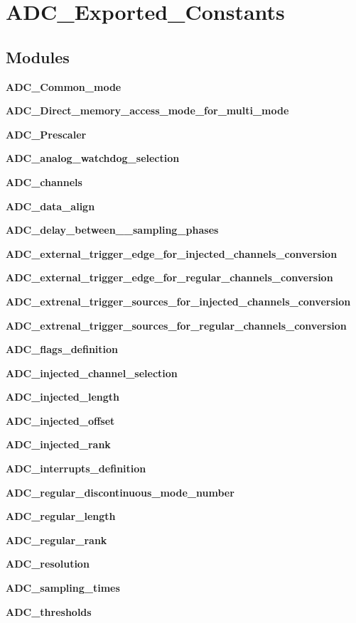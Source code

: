 \section{A\+D\+C\+\_\+\+Exported\+\_\+\+Constants}
\label{group__ADC__Exported__Constants}
\subsection*{Modules}
\begin{DoxyCompactItemize}
\item 
\textbf{ A\+D\+C\+\_\+\+Common\+\_\+mode}
\item 
\textbf{ A\+D\+C\+\_\+\+Direct\+\_\+memory\+\_\+access\+\_\+mode\+\_\+for\+\_\+multi\+\_\+mode}
\item 
\textbf{ A\+D\+C\+\_\+\+Prescaler}
\item 
\textbf{ A\+D\+C\+\_\+analog\+\_\+watchdog\+\_\+selection}
\item 
\textbf{ A\+D\+C\+\_\+channels}
\item 
\textbf{ A\+D\+C\+\_\+data\+\_\+align}
\item 
\textbf{ A\+D\+C\+\_\+delay\+\_\+between\+\_\+\_\+sampling\+\_\+phases}
\item 
\textbf{ A\+D\+C\+\_\+external\+\_\+trigger\+\_\+edge\+\_\+for\+\_\+injected\+\_\+channels\+\_\+conversion}
\item 
\textbf{ A\+D\+C\+\_\+external\+\_\+trigger\+\_\+edge\+\_\+for\+\_\+regular\+\_\+channels\+\_\+conversion}
\item 
\textbf{ A\+D\+C\+\_\+extrenal\+\_\+trigger\+\_\+sources\+\_\+for\+\_\+injected\+\_\+channels\+\_\+conversion}
\item 
\textbf{ A\+D\+C\+\_\+extrenal\+\_\+trigger\+\_\+sources\+\_\+for\+\_\+regular\+\_\+channels\+\_\+conversion}
\item 
\textbf{ A\+D\+C\+\_\+flags\+\_\+definition}
\item 
\textbf{ A\+D\+C\+\_\+injected\+\_\+channel\+\_\+selection}
\item 
\textbf{ A\+D\+C\+\_\+injected\+\_\+length}
\item 
\textbf{ A\+D\+C\+\_\+injected\+\_\+offset}
\item 
\textbf{ A\+D\+C\+\_\+injected\+\_\+rank}
\item 
\textbf{ A\+D\+C\+\_\+interrupts\+\_\+definition}
\item 
\textbf{ A\+D\+C\+\_\+regular\+\_\+discontinuous\+\_\+mode\+\_\+number}
\item 
\textbf{ A\+D\+C\+\_\+regular\+\_\+length}
\item 
\textbf{ A\+D\+C\+\_\+regular\+\_\+rank}
\item 
\textbf{ A\+D\+C\+\_\+resolution}
\item 
\textbf{ A\+D\+C\+\_\+sampling\+\_\+times}
\item 
\textbf{ A\+D\+C\+\_\+thresholds}
\end{DoxyCompactItemize}
